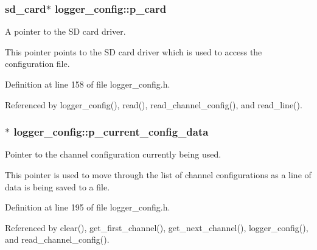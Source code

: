 \hypertarget{classlogger__config_ab9beda58d9d147e75ce85b3b8024cc20}{
\subsubsection[{p\-\_\-card}]{\setlength{\rightskip}{0pt plus 5cm}sd\-\_\-card$\ast$ logger\-\_\-config\-::p\-\_\-card\hspace{0.3cm}{\ttfamily [protected]}}}\label{classlogger__config_ab9beda58d9d147e75ce85b3b8024cc20}


A pointer to the S\-D card driver. 

This pointer points to the S\-D card driver which is used to access the configuration file. 

Definition at line 158 of file logger\-\_\-config.\-h.



Referenced by logger\-\_\-config(), read(), read\-\_\-channel\-\_\-config(), and read\-\_\-line().

\hypertarget{classlogger__config_aaf8a326ecea11b1f24a574f96fb5e52f}{
\subsubsection[{p\-\_\-current\-\_\-config\-\_\-data}]{$\ast$ logger\-\_\-config\-::p\-\_\-current\-\_\-config\-\_\-data\hspace{0.3cm}{\ttfamily [protected]}}}\label{classlogger__config_aaf8a326ecea11b1f24a574f96fb5e52f}


Pointer to the channel configuration currently being used. 

This pointer is used to move through the list of channel configurations as a line of data is being saved to a file. 

Definition at line 195 of file logger\-\_\-config.\-h.



Referenced by clear(), get\-\_\-first\-\_\-channel(), get\-\_\-next\-\_\-channel(), logger\-\_\-config(), and read\-\_\-channel\-\_\-config().

